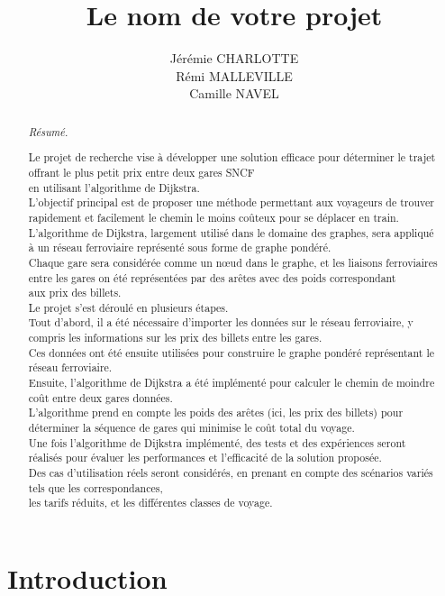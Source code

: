 \documentclass[11pt,a4paper]{article}
\title{Le nom de votre projet}
\author{Jérémie CHARLOTTE\\Rémi MALLEVILLE\\Camille NAVEL}
\begin{document}
\newpage
\begin{abstract}
  \emph{Résumé.}

  Le projet de recherche vise à développer une solution efficace pour déterminer le trajet offrant le plus petit prix entre deux gares SNCF \\
  en utilisant l'algorithme de Dijkstra. \\
  L'objectif principal est de proposer une méthode permettant aux voyageurs de trouver rapidement et facilement le chemin le moins coûteux pour se déplacer en train.\\
  L'algorithme de Dijkstra, largement utilisé dans le domaine des graphes, sera appliqué à un réseau ferroviaire représenté sous forme de graphe pondéré.\\ 
  Chaque gare sera considérée comme un nœud dans le graphe, et les liaisons ferroviaires entre les gares on été représentées par des arêtes avec des poids correspondant\\
  aux prix des billets.\\
  Le projet s'est déroulé en plusieurs étapes.\\ 
  Tout d'abord, il a été nécessaire d'importer les données sur le réseau ferroviaire, y compris les informations sur les prix des billets entre les gares. \\
  Ces données ont été ensuite utilisées pour construire le graphe pondéré représentant le réseau ferroviaire.\\
  Ensuite, l'algorithme de Dijkstra a été implémenté pour calculer le chemin de moindre coût entre deux gares données. \\
  L'algorithme prend en compte les poids des arêtes (ici, les prix des billets) pour déterminer la séquence de gares qui minimise le coût total du voyage.\\
  Une fois l'algorithme de Dijkstra implémenté, des tests et des expériences seront réalisés pour évaluer les performances et l'efficacité de la solution proposée. \\
  Des cas d'utilisation réels seront considérés, en prenant en compte des scénarios variés tels que les correspondances, \\
  les tarifs réduits, et les différentes classes de voyage.

  \end{abstract}


\section{Introduction}
\end{document}

